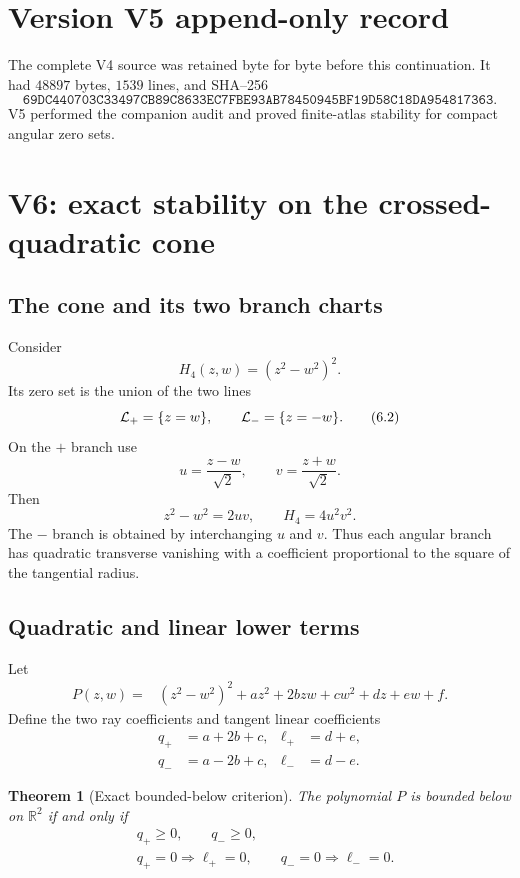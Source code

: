 \documentclass[11pt]{article}
\newtheorem{theorem}{Theorem}[section]
\theoremstyle{remark}
\begin{document}
\section*{Version V5 append-only record}
The complete V4 source was retained byte for byte before this
continuation.  It had \(48897\) bytes, \(1539\) lines, and SHA--256
\[
 \texttt{69DC440703C33497CB89C8633EC7FBE93AB78450945BF19D58C18DA954817363}.
\]
V5 performed the companion audit and proved finite-atlas stability
for compact angular zero sets.


\section{V6: exact stability on the crossed-quadratic cone}
\label{sec:v17v6}

\subsection{The cone and its two branch charts}

Consider
\[
 H_4(z,w)=(z^2-w^2)^2.                              \tag{6.1}
\]
Its zero set is the union of the two lines
\[
 {\cal L}_+=\{z=w\},\qquad
 {\cal L}_-=\{z=-w\}.                               \tag{6.2}
\]
On the \(+\) branch use
\[
 u=\frac{z-w}{\sqrt2},\qquad
 v=\frac{z+w}{\sqrt2}.                              \tag{6.3}
\]
Then
\[
 z^2-w^2=2uv,\qquad H_4=4u^2v^2.                  \tag{6.4}
\]
The \(-\) branch is obtained by interchanging \(u\) and \(v\).
Thus each angular branch has quadratic transverse vanishing with a
coefficient proportional to the square of the tangential radius.

\subsection{Quadratic and linear lower terms}

Let
\[
\begin{split}
 P(z,w)
 ={}&(z^2-w^2)^2+
 az^2+2bzw+cw^2+dz+ew+f.                           \tag{6.5}
\end{split}
\]
Define the two ray coefficients and tangent linear coefficients
\[
\begin{split}
 q_+&=a+2b+c,& \ell_+&=d+e,\\
 q_-&=a-2b+c,& \ell_-&=d-e.                        \tag{6.6}
\end{split}
\]

\begin{theorem}[Exact bounded-below criterion]
\label{thm:v17v6-exact}
The polynomial \(P\) is bounded below on \(\mathbb R^2\) if and only
if
\[
\begin{split}
 &q_+\geq0,\qquad q_-\geq0,                         \tag{6.7}\\
 &q_+=0\Longrightarrow\ell_+=0,\qquad
 q_-=0\Longrightarrow\ell_-=0.                     \tag{6.8}
\end{split}
\]
\end{theorem}
\end{document}
